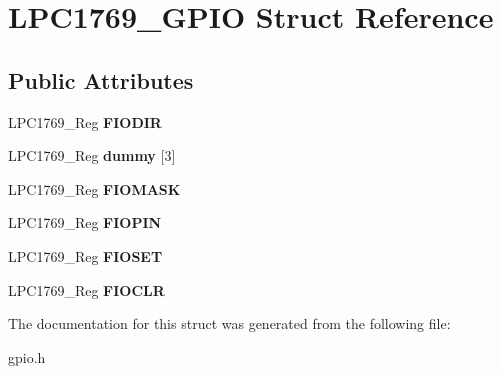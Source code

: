 \hypertarget{struct_l_p_c1769___g_p_i_o}{\section{L\+P\+C1769\+\_\+\+G\+P\+I\+O Struct Reference}
\label{struct_l_p_c1769___g_p_i_o}
}
\subsection*{Public Attributes}
\begin{DoxyCompactItemize}
\item 
\hypertarget{struct_l_p_c1769___g_p_i_o_a836b34b1002a1063a9101f1340fbab28}{L\+P\+C1769\+\_\+\+Reg {\bfseries F\+I\+O\+D\+I\+R}}\label{struct_l_p_c1769___g_p_i_o_a836b34b1002a1063a9101f1340fbab28}

\item 
\hypertarget{struct_l_p_c1769___g_p_i_o_a568671a7dd17718078923bb9645c3471}{L\+P\+C1769\+\_\+\+Reg {\bfseries dummy} \mbox{[}3\mbox{]}}\label{struct_l_p_c1769___g_p_i_o_a568671a7dd17718078923bb9645c3471}

\item 
\hypertarget{struct_l_p_c1769___g_p_i_o_a028c588343e6ceed2e9e43be7f4640fd}{L\+P\+C1769\+\_\+\+Reg {\bfseries F\+I\+O\+M\+A\+S\+K}}\label{struct_l_p_c1769___g_p_i_o_a028c588343e6ceed2e9e43be7f4640fd}

\item 
\hypertarget{struct_l_p_c1769___g_p_i_o_a80eba425256a7948334ba1c18c9e15c0}{L\+P\+C1769\+\_\+\+Reg {\bfseries F\+I\+O\+P\+I\+N}}\label{struct_l_p_c1769___g_p_i_o_a80eba425256a7948334ba1c18c9e15c0}

\item 
\hypertarget{struct_l_p_c1769___g_p_i_o_a6a72a8454e52b8395483c0873a295158}{L\+P\+C1769\+\_\+\+Reg {\bfseries F\+I\+O\+S\+E\+T}}\label{struct_l_p_c1769___g_p_i_o_a6a72a8454e52b8395483c0873a295158}

\item 
\hypertarget{struct_l_p_c1769___g_p_i_o_a87888920186c6c90c024babeb4c6c133}{L\+P\+C1769\+\_\+\+Reg {\bfseries F\+I\+O\+C\+L\+R}}\label{struct_l_p_c1769___g_p_i_o_a87888920186c6c90c024babeb4c6c133}

\end{DoxyCompactItemize}


The documentation for this struct was generated from the following file\+:\begin{DoxyCompactItemize}
\item 
gpio.\+h\end{DoxyCompactItemize}

